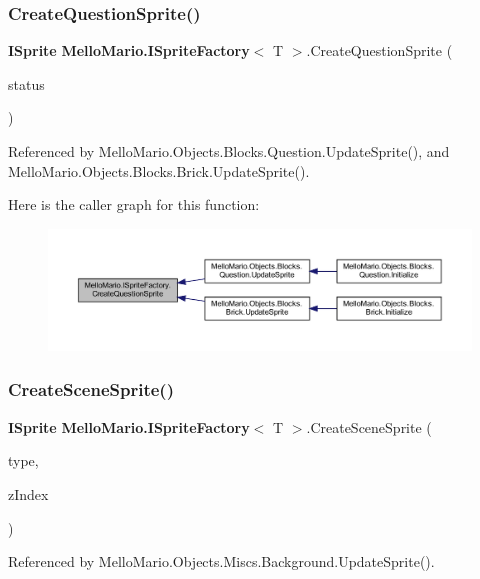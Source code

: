 \subsubsection{Create\+Question\+Sprite()}
{\footnotesize\ttfamily \textbf{ I\+Sprite} \textbf{ Mello\+Mario.\+I\+Sprite\+Factory}$<$ T $>$.Create\+Question\+Sprite (\begin{DoxyParamCaption}\item[{string}]{status }\end{DoxyParamCaption})}



Referenced by Mello\+Mario.\+Objects.\+Blocks.\+Question.\+Update\+Sprite(), and Mello\+Mario.\+Objects.\+Blocks.\+Brick.\+Update\+Sprite().

Here is the caller graph for this function\+:
\nopagebreak
\begin{figure}[H]
\begin{center}
\leavevmode
\includegraphics[width=350pt]{interfaceMelloMario_1_1ISpriteFactory_a8710fe9f56ca91875dd9886232c3b05d_icgraph}
\end{center}
\end{figure}
\mbox{\label{interfaceMelloMario_1_1ISpriteFactory_a5ed277ea73ac3cfd0e4da5f21d8ebf70}} 
\subsubsection{Create\+Scene\+Sprite()}
{\footnotesize\ttfamily \textbf{ I\+Sprite} \textbf{ Mello\+Mario.\+I\+Sprite\+Factory}$<$ T $>$.Create\+Scene\+Sprite (\begin{DoxyParamCaption}\item[{string}]{type,  }\item[{\textbf{ Z\+Index}}]{z\+Index }\end{DoxyParamCaption})}



Referenced by Mello\+Mario.\+Objects.\+Miscs.\+Background.\+Update\+Sprite().

